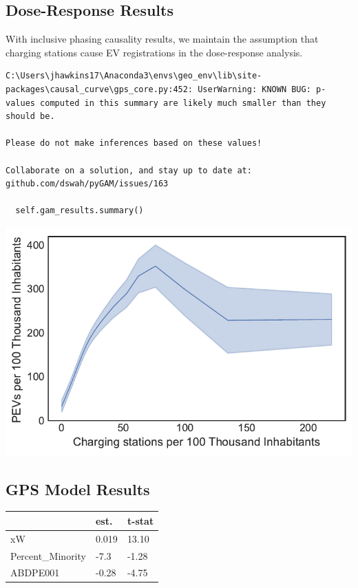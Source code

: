 \documentclass[
  letterpaper,
  DIV=11,
  numbers=noendperiod]{scrartcl}
\begin{document}
\hypertarget{dose-response-results}{%
\subsection{Dose-Response Results}\label{dose-response-results}}

With inclusive phasing causality results, we maintain the assumption
that charging stations cause EV registrations in the dose-response
analysis.

\begin{verbatim}
C:\Users\jhawkins17\Anaconda3\envs\geo_env\lib\site-packages\causal_curve\gps_core.py:452: UserWarning: KNOWN BUG: p-values computed in this summary are likely much smaller than they should be. 
 
Please do not make inferences based on these values! 

Collaborate on a solution, and stay up to date at: 
github.com/dswah/pyGAM/issues/163 

  self.gam_results.summary()
\end{verbatim}

\includegraphics{TRB_2023_files/figure-pdf/cell-21-output-1.pdf}

\hypertarget{gps-model-results}{%
\subsection{GPS Model Results}\label{gps-model-results}}

\begin{longtable}[]{@{}lll@{}}
\toprule()
~ & est. & t-stat \\
\midrule()
\endhead
xW & 0.019 & 13.10 \\
Percent\_Minority & -7.3 & -1.28 \\
ABDPE001 & -0.28 & -4.75 \\
\bottomrule()
\end{longtable}
\end{document}
